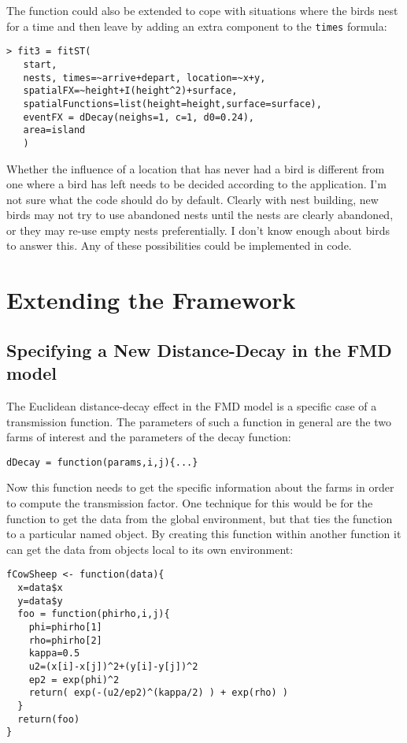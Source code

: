 \documentclass{article}
\begin{document}
The function could also be extended to cope with situations where the birds nest for a time and then
leave by adding an extra component to the \verb|times| formula:

\begin{verbatim}
> fit3 = fitST(
   start,
   nests, times=~arrive+depart, location=~x+y,
   spatialFX=~height+I(height^2)+surface, 
   spatialFunctions=list(height=height,surface=surface),
   eventFX = dDecay(neighs=1, c=1, d0=0.24),
   area=island
   )
\end{verbatim}

Whether the influence of a location that has never had a bird is different from one where a bird has left needs to be decided
according to the application. I'm not sure what the code should do by default. Clearly with nest building, new birds may not 
try to use abandoned nests until the nests are clearly abandoned, or they may re-use empty nests preferentially. I don't know 
enough about birds to answer this. Any of these possibilities could be implemented in code.


\section*{Extending the Framework}

\subsection*{Specifying a New Distance-Decay in the FMD model}

The Euclidean distance-decay effect in the FMD model is a specific case of a transmission function. The parameters of
such a function in general are the two farms of interest and the parameters of the decay function:

\begin{verbatim}
dDecay = function(params,i,j){...}
\end{verbatim}

Now this function needs to get the specific information about the farms in order to compute the transmission factor. One 
technique for this would be for the function to get the data from the global environment, but that ties the function
to a particular named object. By creating this function within another function it can get the data from objects
local to its own environment:

\begin{verbatim}
fCowSheep <- function(data){
  x=data$x
  y=data$y
  foo = function(phirho,i,j){
    phi=phirho[1]
    rho=phirho[2]
    kappa=0.5
    u2=(x[i]-x[j])^2+(y[i]-y[j])^2
    ep2 = exp(phi)^2
    return( exp(-(u2/ep2)^(kappa/2) ) + exp(rho) )
  }
  return(foo)
}
\end{verbatim}
\end{document}
